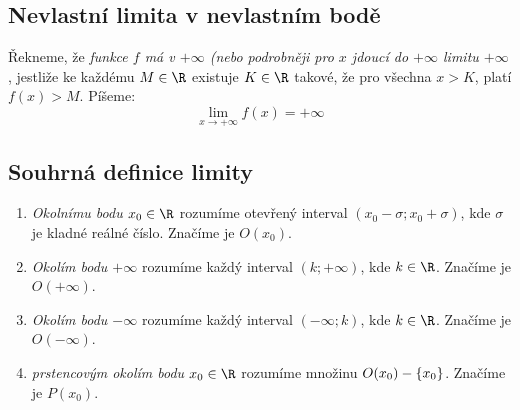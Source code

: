 \begin{enumerate}
\subsection{Nevlastní limita v nevlastním bodě}

\Def Řekneme, že \emph{funkce $f$ má v $+\infty$ (nebo podrobněji pro $x$ jdoucí do $+\infty$ limitu $+\infty$},
jestliže ke každému $M \in \R$ existuje $K \in\R$ takové, že pro všechna $x>K$,
platí $f(x) > M$. Píšeme:
$$\lim_{x\rightarrow +\infty} f(x) = +\infty$$

\subsection{Souhrná definice limity}

\begin{enumerate}
\item
\Def
\emph{Okolnímu bodu $x_0\in\R$} rozumíme otevřený interval $(x_0-\sigma;x_0+\sigma)$, kde $\sigma$ je kladné reálné číslo.
Značíme je $O(x_0)$.
\item \emph{Okolím bodu $+\infty$} rozumíme každý interval $(k;+\infty)$, kde $k\in\R$.
Značíme je $O(+\infty)$.
\item \emph{Okolím bodu $-\infty$} rozumíme každý interval $(-\infty;k)$, kde $k\in\R$.
Značíme je $O(-\infty)$.
\item \emph{prstencovým okolím bodu $x_0\in\R$} rozumíme množinu $O(x_0)-\left\{{x_0}\right\}$. Značíme je $P(x_0)$.
\end{enumerate}

\end{enumerate}

\EndDoc
